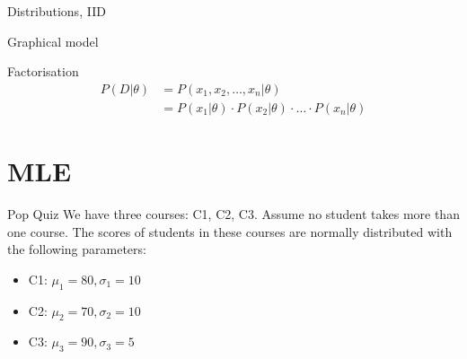 \documentclass[handout]{beamer}
\begin{document}
\begin{section}{Distributions, IID}
\begin{frame}{Graphical model}
        
    \end{frame}

    \begin{frame}{Factorisation}
        \begin{align*}
            P(D|\theta) & = P(x_1, x_2, \ldots, x_n | \theta) \\
            & = P(x_1|\theta) \cdot P(x_2|\theta) \cdot \ldots \cdot P(x_n|\theta)
        \end{align*}
        
    \end{frame}

\end{section}

\section{MLE}
\begin{frame}{Pop Quiz}
    We have three courses: C1, C2, C3. Assume no student takes more than one course.
    The scores of students in these courses are normally distributed with the following parameters:
    \begin{itemize}
        \item C1: $\mu_1 = 80, \sigma_1 = 10$
        \item C2: $\mu_2 = 70, \sigma_2 = 10$
        \item C3: $\mu_3 = 90, \sigma_3 = 5$
    \end{itemize}


    
\end{frame}
\end{document}
